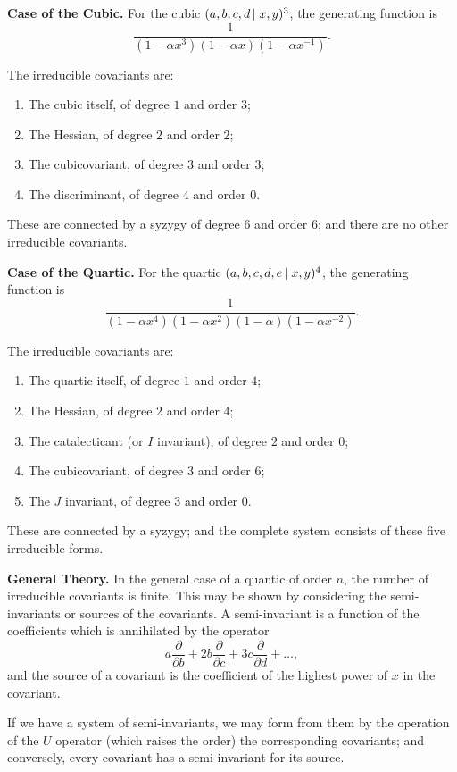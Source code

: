 \documentclass[11pt,a4paper]{book}
\begin{document}
\textbf{Case of the Cubic.} For the cubic $(a,b,c,d \mspace{-2mu}\mid x,y)^3$, the generating
function is
%
\[
\frac{1}{(1-\alpha x^3)(1-\alpha x)(1-\alpha x^{-1})}.
\]

The irreducible covariants are:
\begin{enumerate}[label=(\arabic*)]
\item The cubic itself, of degree $1$ and order $3$;
\item The Hessian, of degree $2$ and order $2$;
\item The cubicovariant, of degree $3$ and order $3$;
\item The discriminant, of degree $4$ and order $0$.
\end{enumerate}

These are connected by a syzygy of degree $6$ and order $6$; and there are
no other irreducible covariants.

\textbf{Case of the Quartic.} For the quartic $(a,b,c,d,e \mspace{-2mu}\mid x,y)^4$, the
generating function is
%
\[
\frac{1}{(1-\alpha x^4)(1-\alpha x^2)(1-\alpha)(1-\alpha x^{-2})}.
\]

The irreducible covariants are:
\begin{enumerate}[label=(\arabic*)]
\item The quartic itself, of degree $1$ and order $4$;
\item The Hessian, of degree $2$ and order $4$;
\item The catalecticant (or $I$ invariant), of degree $2$ and order $0$;
\item The cubicovariant, of degree $3$ and order $6$;
\item The $J$ invariant, of degree $3$ and order $0$.
\end{enumerate}

These are connected by a syzygy; and the complete system consists of these
five irreducible forms.

\textbf{General Theory.} In the general case of a quantic of order $n$, the number
of irreducible covariants is finite. This may be shown by considering the
semi-invariants or sources of the covariants. A semi-invariant is a function
of the coefficients which is annihilated by the operator
%
\[
a \frac{\partial}{\partial b} + 2b \frac{\partial}{\partial c} + 3c \frac{\partial}{\partial d} + \ldots,
\]
%
and the source of a covariant is the coefficient of the highest power of $x$
in the covariant.

If we have a system of semi-invariants, we may form from them by the
operation of the $U$ operator (which raises the order) the corresponding
covariants; and conversely, every covariant has a semi-invariant for its
source.
\end{document}
